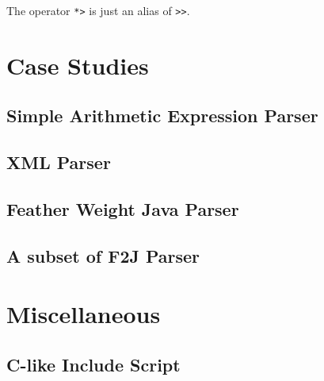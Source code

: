 The operator \texttt{*>} is just an alias of \texttt{>>}.

\section{Case Studies}
\subsection{Simple Arithmetic Expression Parser}

\subsection{XML Parser}

\subsection{Feather Weight Java Parser}

\subsection{A subset of F2J Parser}

\section{Miscellaneous}
\subsection{C-like Include Script}

